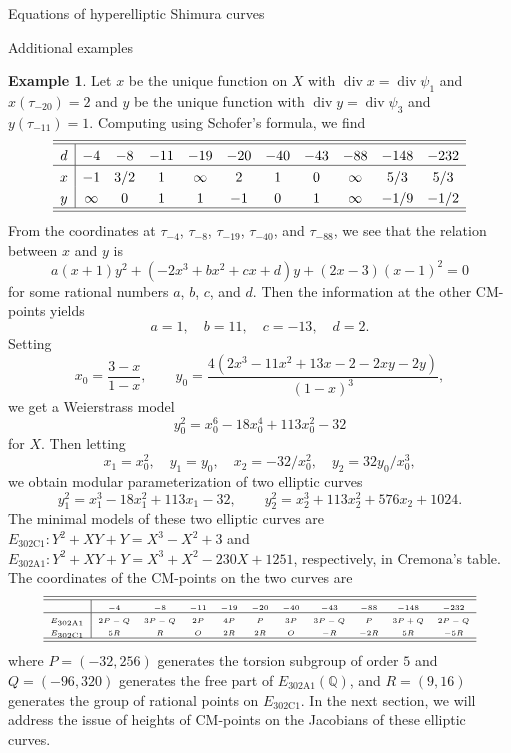 \documentclass{amsart}
\newcounter{lemma}
\theoremstyle{definition}
\newtheorem{Example}[lemma]{Example}
\def\Q{\mathbb Q}
\def\div{\operatorname{div}}
\begin{document}
\begin{section}{Equations of hyperelliptic Shimura curves}
\begin{subsection}{Additional examples}
\begin{Example}
Let $x$ be the unique function on $X$ with
$\div x=\div\psi_{1}$ and $x(\tau_{-20})=2$ and $y$ be the unique
function with $\div y=\div\psi_{3}$ and $y(\tau_{-11})=1$. Computing
using Schofer's formula, we find
$$ \extrarowheight3pt
\begin{array}{c|cccccccccc} \hline\hline
d & -4 & -8 & -11 & -19 & -20 & -40 & -43 & -88 & -148 & -232 \\ \hline
x & -1 & 3/2 & 1 & \infty & 2 & 1 & 0 & \infty & 5/3 & 5/3 \\ 
y & \infty & 0 & 1 & 1 & -1 & 0 & 1 & \infty & -1/9 & -1/2 \\
\hline\hline
\end{array}
$$
From the coordinates at $\tau_{-4}$, $\tau_{-8}$, $\tau_{-19}$, $\tau_{-40}$, and
$\tau_{-88}$, we see that the relation between $x$ and $y$ is
$$
  a(x+1)y^2+(-2x^3+bx^2+cx+d)y+(2x-3)(x-1)^2=0
$$
for some rational numbers $a$, $b$, $c$, and $d$. Then the information
at the other CM-points yields
$$
  a=1, \quad b=11, \quad c=-13, \quad d=2.
$$
Setting
$$
  x_0=\frac{3-x}{1-x}, \qquad
  y_0=\frac{4(2x^3-11x^2+13x-2-2xy-2y)}{(1-x)^3},
$$
we get a Weierstrass model
$$
  y_0^2=x_0^6-18x_0^4+113x_0^2-32
$$
for $X$. Then letting
$$
  x_1=x_0^2, \quad y_1=y_0, \quad
  x_2=-32/x_0^2, \quad y_2=32y_0/x_0^3,
$$
we obtain modular parameterization of two elliptic curves
$$
  y_1^2=x_1^3-18x_1^2+113x_1-32, \qquad y_2^2=x_2^3+113x_2^2+576x_2+1024.
$$
The minimal models of these two elliptic curves are
$E_{\text{302C1}}:Y^2+XY+Y=X^3-X^2+3$ and
$E_{\text{302A1}}:Y^2+XY+Y=X^3+X^2-230X+1251$,
respectively, in Cremona's table. The coordinates of the
CM-points on the two curves are
$$ \tiny\extrarowheight3pt
\begin{array}{c|cccccccccc} \hline\hline
  & -4 & -8 & -11 & -19 & -20 & -40 & -43 & -88 & -148 & -232 \\ \hline
E_{\text{302A1}} & 2P-Q & 3P-Q & 2P & 4P & P & 3P & 3P-Q & P & 3P+Q &
2P-Q \\
E_{\text{302C1}} & 5R & R & O & 2R & 2R & O & -R & -2R & 5R & -5R \\
\hline\hline
\end{array}
$$
where $P=(-32,256)$ generates the torsion subgroup of order $5$ and
$Q=(-96,320)$ generates the free part of $E_{\text{302A1}}(\Q)$, and
$R=(9,16)$ generates the group of rational points on
$E_{\text{302C1}}$. In the next section,
we will address the issue of heights of CM-points on the Jacobians
of these elliptic curves.
\end{Example}
\end{subsection}
\end{section}
\end{document}
